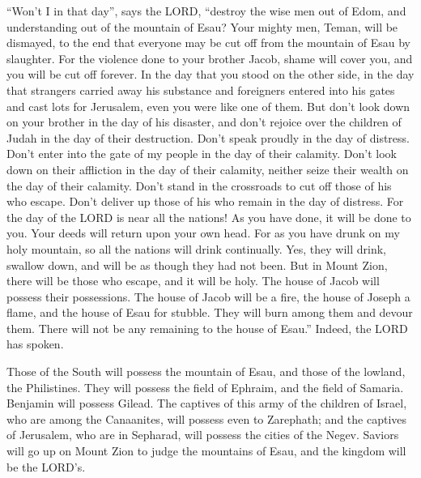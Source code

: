 \myverse{}“Won’t I in that day”, says the LORD, “destroy the wise men out of Edom, and understanding out of the mountain of Esau? \myverse{}Your mighty men, Teman, will be dismayed, to the end that everyone may be cut off from the mountain of Esau by slaughter. \myverse{}For the violence done to your brother Jacob, shame will cover you, and you will be cut off forever. \myverse{}In the day that you stood on the other side, in the day that strangers carried away his substance and foreigners entered into his gates and cast lots for Jerusalem, even you were like one of them. \myverse{}But don’t look down on your brother in the day of his disaster, and don’t rejoice over the children of Judah in the day of their destruction. Don’t speak proudly in the day of distress. \myverse{}Don’t enter into the gate of my people in the day of their calamity. Don’t look down on their affliction in the day of their calamity, neither seize their wealth on the day of their calamity. \myverse{}Don’t stand in the crossroads to cut off those of his who escape. Don’t deliver up those of his who remain in the day of distress. \myverse{}For the day of the LORD is near all the nations! As you have done, it will be done to you. Your deeds will return upon your own head. \myverse{}For as you have drunk on my holy mountain, so all the nations will drink continually. Yes, they will drink, swallow down, and will be as though they had not been. \myverse{}But in Mount Zion, there will be those who escape, and it will be holy. The house of Jacob will possess their possessions. \myverse{}The house of Jacob will be a fire, the house of Joseph a flame, and the house of Esau for stubble. They will burn among them and devour them. There will not be any remaining to the house of Esau.” Indeed, the LORD has spoken.

\myverse{}Those of the South will possess the mountain of Esau, and those of the lowland, the Philistines. They will possess the field of Ephraim, and the field of Samaria. Benjamin will possess Gilead. \myverse{}The captives of this army of the children of Israel, who are among the Canaanites, will possess even to Zarephath; and the captives of Jerusalem, who are in Sepharad, will possess the cities of the Negev. \myverse{}Saviors will go up on Mount Zion to judge the mountains of Esau, and the kingdom will be the LORD’s.